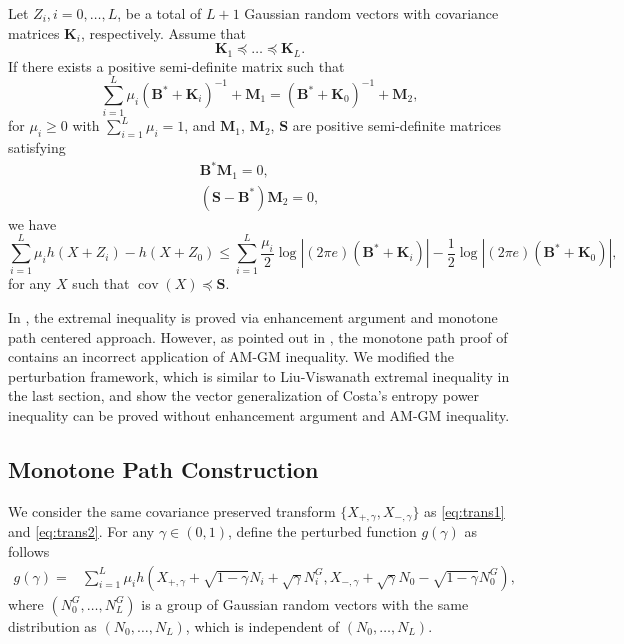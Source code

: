 \documentclass[journal,final, onecolumn]{IEEEtran}
\DeclareMathOperator{\cov}{cov}
\begin{document}
\begin{theorem}\cite[Theroem 2]{LLPS13}\label{thm2}
Let $Z_{i}, i=0,\ldots,L$, be a total of $L+1$ Gaussian random vectors with covariance matrices $\boldsymbol{K}_{i}$, respectively. Assume that
\begin{equation}
\boldsymbol{K}_{1} \preceq \ldots \preceq \boldsymbol{K}_{L}.
\end{equation}
If there exists a positive semi-definite matrix such that
\begin{equation}
\sum_{i=1}^{L} \mu_{i} \left(   \boldsymbol{B}^{*} + \boldsymbol{K}_{i}        \right)^{-1} + \boldsymbol{M}_{1} = \left(   \boldsymbol{B}^{*} + \boldsymbol{K}_{0}        \right)^{-1} + \boldsymbol{M}_{2},\label{eq:57}
\end{equation}
for $\mu_{i} \geq 0$ with $\sum_{i=1}^{L} \mu _{i} = 1$, and $\boldsymbol{M}_1$, $\boldsymbol{M}_2$, $\boldsymbol{S}$ are positive semi-definite matrices satisfying
\begin{align}
\boldsymbol{B}^{*}\boldsymbol{M}_{1} = 0,\\
\left(\boldsymbol{S} - \boldsymbol{B}^{*} \right) \boldsymbol{M}_2 =0,
\end{align}
we have
\begin{equation}
\sum_{i=1}^{L}\mu_ih(X+Z_i) -h(X+Z_0)\leq \sum_{i=1}^{L}\frac{\mu_i}{2} \log \left|  (2 \pi e) \left(\boldsymbol{B}^{*} + \boldsymbol{K}_{i}\right)          \right| - \frac{1}{2} \log \left|  (2 \pi e)\left( \boldsymbol{B}^{*} + \boldsymbol{K}_{0}   \right)       \right|,\label{eq:main2}
\end{equation}
for any $X$ such that $\cov (X)\preceq \boldsymbol{S}$.
\end{theorem}
\begin{remark}
In \cite{LLPS13}, the extremal inequality is proved via enhancement argument and monotone path centered approach. However, as pointed out in \cite{CHW18}, the monotone path proof of \cite{LLPS13} contains an incorrect application of AM-GM inequality. We modified the perturbation framework, which is similar to Liu-Viswanath extremal inequality in the last section, and show the vector generalization of Costa's entropy power inequality can be proved without enhancement argument and  AM-GM inequality.
\end{remark}

\subsection{Monotone Path Construction}
We consider the same covariance preserved transform $\{X_{+,\gamma}, X_{-,\gamma}\}$ as \eqref{eq:trans1} and \eqref{eq:trans2}. For any $\gamma \in (0,1)$, define the perturbed function $g(\gamma)$ as follows
\begin{align}
g(\gamma) =& \sum_{i=1}^{L} \mu_{i} h\left(X_{+,\gamma}+\sqrt{1-\gamma}N_{i}+\sqrt{\gamma}N_{i}^{G}, X_{-,\gamma}+\sqrt{\gamma}N_{0}-\sqrt{1-\gamma}N^{G}_{0}\right),
\end{align}
where $(N_{0}^{G}, \ldots, N_{L}^{G})$ is a group of Gaussian random vectors with the same distribution as $(N_{0}, \ldots, N_{L})$, which is independent of $(N_{0}, \ldots, N_{L})$.
\end{document}
